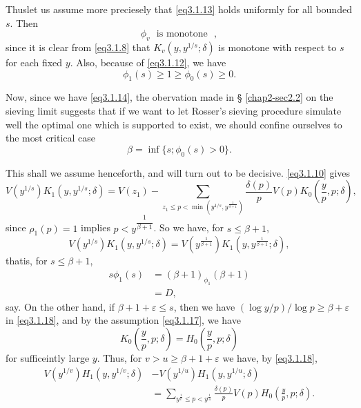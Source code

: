 Thus\pageoriginale let us assume more preciesely that \eqref{eq3.1.13}
holds uniformly for all bounded $s$. Then  
\begin{equation*}
  \phi_v \text{~ is monotone~ }, \tag{3.1.15}\label{eq3.1.15}
\end{equation*}
since it is clear from \eqref{eq3.1.8} that $K_v (y,y^{1/s}; \delta)$ is
monotone with respect to $s$ for each fixed $y$. Also, because of
\eqref{eq3.1.12}, we have 
\begin{equation*}
  \phi_1 (s)\ge 1 \ge \phi_0 (s)\ge 0. \tag{3.1.16}\label{eq3.1.16}
\end{equation*}

Now, since we have \eqref{eq3.1.14}, the obervation made in \S
\ref{chap2-sec2.2} on the 
sieving limit suggests that if we want to let Rosser's sieving
procedure simulate well the optimal one which is supported to exist,
we should confine ourselves to the most critical case 
\begin{equation*}
  \beta = \inf \{ s; \phi_0 (s)> 0 \}. \tag{3.1.17}\label{eq3.1.17}
\end{equation*}

This shall we assume henceforth, and will turn out to be
decisive. \eqref{eq3.1.10} gives 
\begin{equation*}
  V(y^{1/s}) K_1 (y,y^{1/s}; \delta)
  =V(z_1)- \sum _{z_1 \le p< \min (y^{1/s},y^{\frac{1}{\beta+1}})}
  \frac{\delta (p)}{p}V (p)K_0 (\frac{y}{p},p ; \delta),
  \tag{3.1.18} \label{eq3.1.18} 
\end{equation*}
since $\rho_1(p)=1$ implies $p <y ^{\dfrac {1}{\beta +1}}$. So we
have, for $s \le \beta +1$, 
$$
V(y^{1/s})K_1 (y, y^{1/s}; \delta)=V (y^{\frac {1}{\beta +1}})K_1
(y,y^{\frac{1}{\beta +1}}; \delta), 
$$
that\pageoriginale is, for $s \le \beta +1$,
\begin{align*}
  s \phi _1 (s)&= (\beta +1)_{\phi_1}(\beta +1)\\
  &= D,\tag{3.1.19}\label{eq3.1.19}
\end{align*}
say. On the other hand, if $\beta +1 + \varepsilon \le s$, then we have $(\log
y/p)/ \log p \ge \beta + \varepsilon$ in \eqref{eq3.1.18}, and by the assumption
\eqref{eq3.1.17}, we have 
$$
K_0 \left(\frac{y}{p}, p; \delta\right) = H_0 \left(\frac{y}{p},p; \delta\right)
$$
for sufficeintly large $y$. Thus, for $v > u \ge \beta +1+\varepsilon$ we
have, by \eqref{eq3.1.18}, 
\begin{align*}
   V(y^{1/v}) H_1 (y,y^{1/v}; \delta)&-V (y^{1/u}) H_1 (y,y^{1/u}; \delta)\\
  & =  \sum_{y^{\frac{1}{v}}\le p < y^{\frac{1}{u}}}
  \frac{\delta{(p)}}{p} V(p)H_0 \left(\frac{y}{p},p; \delta\right). 
\end{align*}

